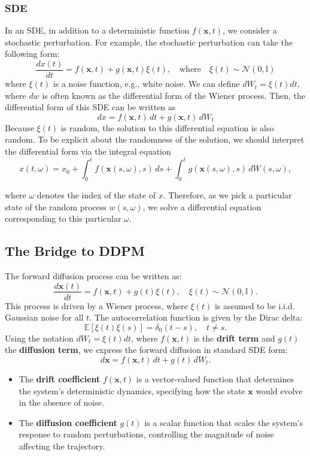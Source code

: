 \documentclass{article}
\newcommand{\x}{\mathbf{x}}
\newcommand{\N}{\mathcal{N}}
\begin{document}
	\subsubsection*{SDE}
	
	In an SDE, in addition to a deterministic function $f(\x, t)$, we consider a stochastic perturbation. For example, the stochastic perturbation can take the following form:
	$$
	\frac{dx(t)}{dt} = f(\x, t) + g(\x, t) \xi(t), \quad \text{where} \quad \xi(t) \sim \N(0, \mathbb{I})
	$$
	where $\xi(t)$ is a noise function, e.g., white noise. We can define $dW_t = \xi(t) dt$, where $dw$ is often known as the differential form of the Wiener process. Then, the differential form of this SDE can be written as
	$$
	dx = f(\x, t) \, dt + g(\x, t) \, dW_t
	$$
	Because $\xi(t)$ is random, the solution to this differential equation is also random. To be explicit about the randomness of the solution, we should interpret the differential form via the integral equation
	$$
	x(t, \omega) = x_0 + \int_{0}^{t} f(\x(s, \omega), s) \, ds + \int_{0}^{t} g(\x(s, \omega), s) \, dW(s, \omega),
	$$
	
	where $\omega$ denotes the index of the state of $x$. Therefore, as we pick a particular state of the random process $w(s, \omega)$, we solve a differential equation corresponding to this particular $\omega$.
	
	\subsection*{The Bridge to DDPM}
	
	The forward diffusion process can be written as:
	$$
	\frac{d\x(t)}{dt} = f(\x, t) + g(t)\xi(t), \quad \xi(t) \sim \mathcal{N}(0, \mathbb{I}).
	$$
	This process is driven by a Wiener process, where $\xi(t)$ is assumed to be i.i.d. Gaussian noise for all $t$. The autocorrelation function is given by the Dirac delta:
	$$
	\mathbb{E}[\xi(t)\xi(s)] = \delta_0(t - s), \quad t \neq s.
	$$
	Using the notation $dW_t = \xi(t) dt$, where $f(\x, t)$ is the \textbf{drift term} and $g(t)$ the \textbf{diffusion term}, we express the forward diffusion in standard SDE form:
	$$
	d\x = f(\x, t) \, dt + g(t) \, dW_t.
	$$
	
	\begin{itemize}
		\item The \textbf{drift coefficient} $f(\x, t)$ is a vector-valued function that determines the system's deterministic dynamics, specifying how the state $\x$ would evolve in the absence of noise.
		
		\item The \textbf{diffusion coefficient} $g(t)$ is a scalar function that scales the system's response to random perturbations, controlling the magnitude of noise affecting the trajectory.
	\end{itemize}
	
\end{document}
